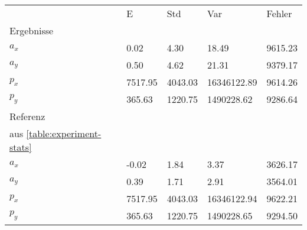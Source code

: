 \begin{tabular}{l|l|l|l|l}

     & E   & Std    & Var    & Fehler \\
\hhline{=|=|=|=|=}

Ergebnisse & & & & \\
$a_x$  &         0.02 &         4.30 &        18.49 &      9615.23 \\
$a_y$  &         0.50 &         4.62 &        21.31 &      9379.17 \\
$p_x$  &      7517.95 &      4043.03 &  16346122.89 &      9614.26 \\
$p_y$  &       365.63 &      1220.75 &   1490228.62 &      9286.64 \\

\hline
Referenz & & & & \\
aus \ref{table:experiment-stats} & & & & \\
$a_x$  &        -0.02 &         1.84 &         3.37 &      3626.17 \\
$a_y$  &         0.39 &         1.71 &         2.91 &      3564.01 \\
$p_x$  &      7517.95 &      4043.03 &  16346122.94 &      9622.21 \\
$p_y$  &       365.63 &      1220.75 &   1490228.65 &      9294.50 \\
\end{tabular}

